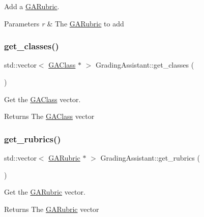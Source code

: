 Add a \hyperlink{class_g_a_rubric}{G\+A\+Rubric}. 


\begin{DoxyParams}{Parameters}
{\em r} & The \hyperlink{class_g_a_rubric}{G\+A\+Rubric} to add \\
\hline
\end{DoxyParams}
\mbox{\label{class_grading_assistant_af386f98b366cae34c8761f8c133f9eb9}} 
\subsubsection{\texorpdfstring{get\+\_\+classes()}{get\_classes()}}
{\footnotesize\ttfamily std\+::vector$<$ \hyperlink{class_g_a_class}{G\+A\+Class} $\ast$ $>$ Grading\+Assistant\+::get\+\_\+classes (\begin{DoxyParamCaption}{ }\end{DoxyParamCaption})}



Get the \hyperlink{class_g_a_class}{G\+A\+Class} vector. 

\begin{DoxyReturn}{Returns}
The \hyperlink{class_g_a_class}{G\+A\+Class} vector 
\end{DoxyReturn}
\mbox{\label{class_grading_assistant_a05211ce3152422e668e6afeb5f9726bb}} 
\subsubsection{\texorpdfstring{get\+\_\+rubrics()}{get\_rubrics()}}
{\footnotesize\ttfamily std\+::vector$<$ \hyperlink{class_g_a_rubric}{G\+A\+Rubric} $\ast$ $>$ Grading\+Assistant\+::get\+\_\+rubrics (\begin{DoxyParamCaption}{ }\end{DoxyParamCaption})}



Get the \hyperlink{class_g_a_rubric}{G\+A\+Rubric} vector. 

\begin{DoxyReturn}{Returns}
The \hyperlink{class_g_a_rubric}{G\+A\+Rubric} vector 
\end{DoxyReturn}
\mbox{\label{class_grading_assistant_a2430309557f1fd413a75165b4c7c9a3a}} 
